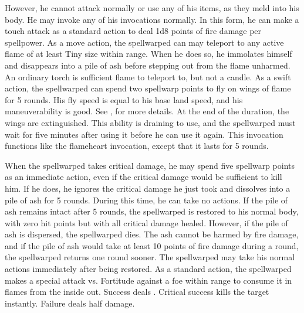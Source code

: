 However, he cannot attack normally or use any of his items, as they meld into his body.
He may invoke any of his invocations normally.
In this form, he can make a touch attack as a standard action to deal 1d8 points of fire damage per spellpower.
As a move action, the spellwarped can may teleport to any active flame of at least Tiny size within \rngmed range.
When he does so, he immolates himself and disappears into a pile of ash before stepping out from the flame unharmed.
An ordinary torch is sufficient flame to teleport to, but not a candle.
As a swift action, the spellwarped can spend two spellwarp points to fly on wings of flame for 5 rounds.
His fly speed is equal to his base land speed, and his maneuverability is good.
See , for more details.
At the end of the duration, the wings are extinguished.
This ability is draining to use, and the spellwarped must wait for five minutes after using it before he can use it again.
This invocation functions like the flameheart invocation, except that it lasts for 5 rounds.

When the spellwarped takes critical damage, he may spend five spellwarp points as an immediate action, even if the critical damage would be sufficient to kill him.
If he does, he ignores the critical damage he just took and dissolves into a pile of ash for 5 rounds.
During this time, he can take no actions.
If the pile of ash remains intact after 5 rounds, the spellwarped is restored to his normal body, with zero hit points but with all critical damage healed.
However, if the pile of ash is dispersed, the spellwarped dies.
The ash cannot be harmed by fire damage, and if the pile of ash would take at least 10 points of fire damage during a round, the spellwarped returns one round sooner.
The spellwarped may take his normal actions immediately after being restored.
As a standard action, the spellwarped makes a special attack vs. Fortitude against a foe within \rngclose range to consume it in flames from the inside out.
Success deals .
Critical success kills the target instantly.
Failure deals half damage.

